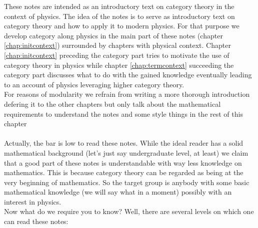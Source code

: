 These notes are intended as an introductory text on category theory in the context of physics. The idea of the notes is to serve as introductory text on category theory and how to apply it to modern physics. For that purpose we develop category along physics in the main part of these notes (chapter \ref{chap:initcontext}) surrounded by chapters with physical context. Chapter \ref{chap:initcontext} preceding the category part tries to motivate the use of category theory in physics while chapter \ref{chap:termcontext} succeeding the category part discusses what to do with the gained knowledge eventually leading to an account of physics \cite{a565d200} leveraging higher category theory.
\\
For reasons of modularity we refrain from writing a more thorough introduction defering it to the other chapters but only talk about the mathematical requirements to understand the notes and some style things in the rest of this chapter
\\\\
Actually, the bar is low to read these notes. While the ideal reader has a solid mathematical background (let's just say undergraduate level, at least) we claim that a good part of these notes is understandable with way less knowledge on mathematics. This is because category theory can be regarded as being at the very beginning of mathematics. So the target group is anybody with some basic mathematical knowledge (we will say {\glqq}what{\grqq} in a moment) possibly with an interest in physics.
\\
Now what do we require you to know? Well, there are several levels on which one can read these notes:
